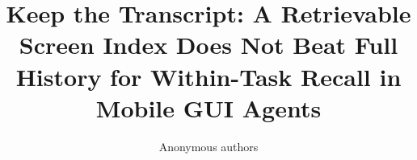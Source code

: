 \documentclass[10pt]{article}
\title{Keep the Transcript: A Retrievable Screen Index Does Not Beat Full History for Within-Task Recall in Mobile GUI Agents}
\author{Anonymous authors}
\date{}
\begin{document}
\maketitle

\begin{abstract}

\end{abstract}










\end{document}

